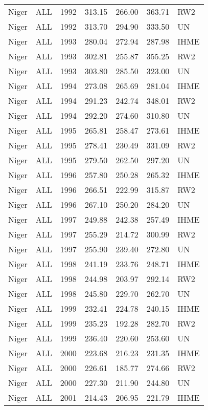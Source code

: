 \begin{longtable}{lllrrrl}
  Niger & ALL & 1992 & 313.15 & 266.00 & 363.71 & RW2 \\ 
  Niger & ALL & 1992 & 313.70 & 294.90 & 333.50 & UN \\ 
  Niger & ALL & 1993 & 280.04 & 272.94 & 287.98 & IHME \\ 
  Niger & ALL & 1993 & 302.81 & 255.87 & 355.25 & RW2 \\ 
  Niger & ALL & 1993 & 303.80 & 285.50 & 323.00 & UN \\ 
  Niger & ALL & 1994 & 273.08 & 265.69 & 281.04 & IHME \\ 
  Niger & ALL & 1994 & 291.23 & 242.74 & 348.01 & RW2 \\ 
  Niger & ALL & 1994 & 292.20 & 274.60 & 310.80 & UN \\ 
  Niger & ALL & 1995 & 265.81 & 258.47 & 273.61 & IHME \\ 
  Niger & ALL & 1995 & 278.41 & 230.49 & 331.09 & RW2 \\ 
  Niger & ALL & 1995 & 279.50 & 262.50 & 297.20 & UN \\ 
  Niger & ALL & 1996 & 257.80 & 250.28 & 265.32 & IHME \\ 
  Niger & ALL & 1996 & 266.51 & 222.99 & 315.87 & RW2 \\ 
  Niger & ALL & 1996 & 267.10 & 250.20 & 284.20 & UN \\ 
  Niger & ALL & 1997 & 249.88 & 242.38 & 257.49 & IHME \\ 
  Niger & ALL & 1997 & 255.29 & 214.72 & 300.99 & RW2 \\ 
  Niger & ALL & 1997 & 255.90 & 239.40 & 272.80 & UN \\ 
  Niger & ALL & 1998 & 241.19 & 233.76 & 248.71 & IHME \\ 
  Niger & ALL & 1998 & 244.98 & 203.97 & 292.14 & RW2 \\ 
  Niger & ALL & 1998 & 245.80 & 229.70 & 262.70 & UN \\ 
  Niger & ALL & 1999 & 232.41 & 224.78 & 240.15 & IHME \\ 
  Niger & ALL & 1999 & 235.23 & 192.28 & 282.70 & RW2 \\ 
  Niger & ALL & 1999 & 236.40 & 220.60 & 253.60 & UN \\ 
  Niger & ALL & 2000 & 223.68 & 216.23 & 231.35 & IHME \\ 
  Niger & ALL & 2000 & 226.61 & 185.77 & 274.66 & RW2 \\ 
  Niger & ALL & 2000 & 227.30 & 211.90 & 244.80 & UN \\ 
  Niger & ALL & 2001 & 214.43 & 206.95 & 221.79 & IHME \\ 

\end{longtable}
